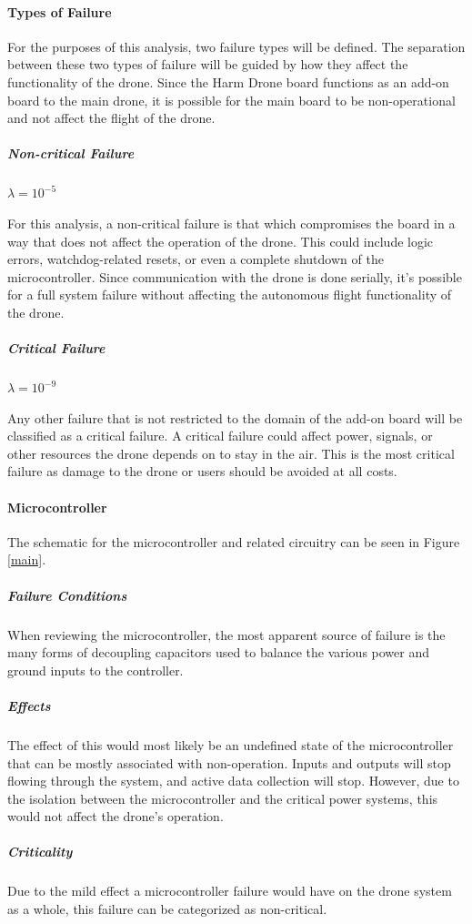\documentclass[12pt]{article}
\begin{document}
\paragraph{Types of Failure}
\par For the purposes of this analysis, two failure types will be defined. The separation between these two types of failure will be guided by how they affect the functionality of the drone. Since the Harm Drone board functions as an add-on board to the main drone, it is possible for the main board to be non-operational and not affect the flight of the drone.
\subparagraph{Non-critical Failure}
$\lambda = 10^{-5}$
\par For this analysis, a non-critical failure is that which compromises the board in a way that does not affect the operation of the drone. This could include logic errors, watchdog-related resets, or even a complete shutdown of the microcontroller. Since communication with the drone is done serially, it's possible for a full system failure without affecting the autonomous flight functionality of the drone.
\subparagraph{Critical Failure}
$\lambda = 10^{-9}$
\par Any other failure that is not restricted to the domain of the add-on board will be classified as a critical failure. A critical failure could affect power, signals, or other resources the drone depends on to stay in the air. This is the most critical failure as damage to the drone or users should be avoided at all costs.
\paragraph{Microcontroller}
\par The schematic for the microcontroller and related circuitry can be seen in Figure \ref{main}.
\subparagraph{Failure Conditions}
\par When reviewing the microcontroller, the most apparent source of failure is the many forms of decoupling capacitors used to balance the various power and ground inputs to the controller.
\subparagraph{Effects}
\par The effect of this would most likely be an undefined state of the microcontroller that can be mostly associated with non-operation. Inputs and outputs will stop flowing through the system, and active data collection will stop. However, due to the isolation between the microcontroller and the critical power systems, this would not affect the drone's operation.
\subparagraph{Criticality}
\par Due to the mild effect a microcontroller failure would have on the drone system as a whole, this failure can be categorized as non-critical.
\end{document}
